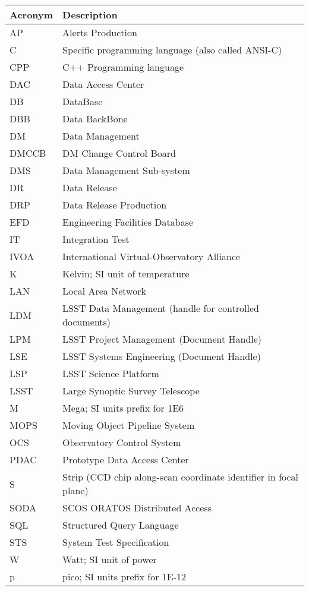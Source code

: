 \addtocounter{table}{-1}
\begin{longtable}{|l|p{}|}\hline
\textbf{Acronym} & \textbf{Description}  \\\hline

AP & Alerts Production \\\hline
C & Specific programming language (also called ANSI-C) \\\hline
CPP & C++ Programming language \\\hline
DAC & Data Access Center \\\hline
DB & DataBase \\\hline
DBB & Data BackBone \\\hline
DM & Data Management \\\hline
DMCCB & DM Change Control Board \\\hline
DMS & Data Management Sub-system \\\hline
DR & Data Release \\\hline
DRP & Data Release Production \\\hline
EFD & Engineering Facilities Database \\\hline
IT & Integration Test \\\hline
IVOA & International Virtual-Observatory Alliance \\\hline
K & Kelvin; SI unit of temperature \\\hline
LAN & Local Area Network \\\hline
LDM & LSST Data Management (handle for controlled documents) \\\hline
LPM & LSST Project Management (Document Handle) \\\hline
LSE & LSST Systems Engineering (Document Handle) \\\hline
LSP & LSST Science Platform \\\hline
LSST & Large Synoptic Survey Telescope \\\hline
M & Mega; SI units prefix for 1E6 \\\hline
MOPS & Moving Object Pipeline System \\\hline
OCS & Observatory Control System \\\hline
PDAC & Prototype Data Access Center \\\hline
S & Strip (CCD chip along-scan coordinate identifier in focal plane) \\\hline
SODA & SCOS ORATOS Distributed Access \\\hline
SQL & Structured Query Language \\\hline
STS & System Test Specification \\\hline
W & Watt; SI unit of power \\\hline
p & pico; SI units prefix for 1E-12 \\\hline
\end{longtable}
